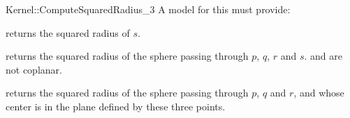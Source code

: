 \begin{ccRefFunctionObjectConcept}{Kernel::ComputeSquaredRadius_3}
A model for this must provide:


       {returns the squared radius of $s$. }

       {returns the squared radius of the sphere passing through $p$, $q$, $r$
       and $s$. \ccPrecond {} and  are not coplanar.}

       {returns the squared radius of the sphere passing through $p$, $q$ and
       $r$, and whose center is in the plane defined by these three points.}

\ccSeeAlso
{}\\
 \\

\end{ccRefFunctionObjectConcept}
